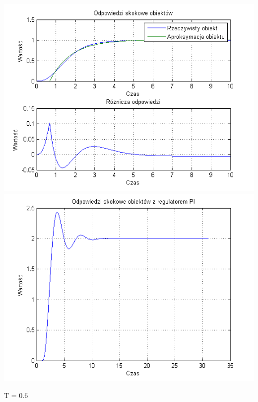 \documentclass[10pt,a4paper]{article}
\begin{document}
\begin{center}
\includegraphics[scale=1]{images/jeden/skrypt_255.png}\\
\includegraphics[scale=1]{images/jeden/skrypt_256.png}\\
\end{center}
\newpage
T = 0.6
\end{document}
